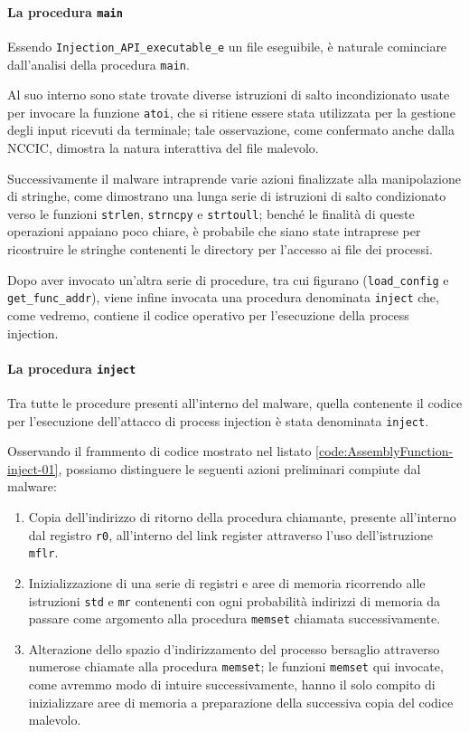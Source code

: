\documentclass[10pt,a4paper, titlepage]{report}
\begin{document}
\paragraph{La procedura \texttt{main}} 

Essendo \texttt{Injection\_API\_executable\_e} un file eseguibile, è naturale cominciare dall'analisi della procedura \texttt{main}.

Al suo interno sono state trovate diverse istruzioni di salto incondizionato usate per invocare la funzione \texttt{atoi}, che si ritiene essere stata utilizzata per la gestione degli input ricevuti da terminale; tale osservazione, come confermato anche dalla NCCIC, dimostra la natura interattiva del file malevolo.  

Successivamente il malware intraprende varie azioni finalizzate alla manipolazione di stringhe, come dimostrano una lunga serie di istruzioni di salto condizionato verso le funzioni \texttt{strlen}, \texttt{strncpy} e \texttt{strtoull}; benché le finalità di queste operazioni appaiano poco chiare, è probabile che siano state intraprese per ricostruire le stringhe contenenti le directory per l'accesso ai file dei processi.

Dopo aver invocato un'altra serie di procedure, tra cui figurano (\texttt{load\_config} e \texttt{get\_func\_addr}), viene infine invocata una procedura denominata \texttt{inject} che, come vedremo, contiene il codice operativo per l'esecuzione della process injection. 

\paragraph{La procedura \texttt{inject}}

Tra tutte le procedure presenti all'interno del malware, quella contenente il codice per l'esecuzione dell'attacco di process injection è stata denominata     \texttt{inject}.

Osservando il frammento di codice mostrato nel listato \ref{code:AssemblyFunction-inject-01}, possiamo distinguere le seguenti azioni preliminari compiute dal malware:

\begin{enumerate}
\item Copia dell'indirizzo di ritorno della procedura chiamante, presente all'interno dal registro \texttt{r0}, all'interno del link register attraverso l'uso dell'istruzione \texttt{mflr}.
\item Inizializzazione di una serie di registri e aree di memoria ricorrendo alle istruzioni \texttt{std} e \texttt{mr} contenenti con ogni probabilità indirizzi di memoria da passare come argomento alla procedura \texttt{memset} chiamata successivamente.
\item Alterazione dello spazio d'indirizzamento del processo bersaglio attraverso numerose chiamate alla procedura \texttt{memset}; le funzioni \texttt{memset} qui invocate, come avremmo modo di intuire successivamente, hanno il solo compito di inizializzare aree di memoria a preparazione della successiva copia del codice malevolo.
 
\end{enumerate}
\end{document}
